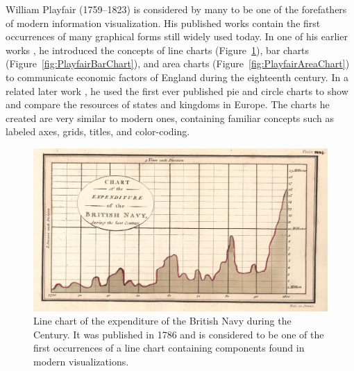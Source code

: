 William Playfair (1759--1823) is considered by many to be one of the
forefathers of modern information visualization. His published works
contain the first occurrences of many graphical forms still widely
used today. In one of his earlier works
\parencite{CommercialAndPoliticalAtlas}, he introduced the concepts of
line charts (Figure~\ref{fig:PlayfairLineChart}), bar charts
(Figure~\ref{fig:PlayfairBarChart}), and area charts
(Figure~\ref{fig:PlayfairAreaChart}) to communicate economic factors
of England during the eighteenth century. In a related later work
\parencite{StatisticalBreviary}, he used the first ever published pie
and circle charts to show and compare the resources of states and
kingdoms in Europe. The charts he created are very similar to modern
ones, containing familiar concepts such as labeled axes, grids,
titles, and color-coding.



\begin{figure}[tp]
\centering
\includegraphics[keepaspectratio,width=\linewidth,height=\thirdh]
{images/playfair-line-chart.jpg}
\caption[Line Chart by William Playfair from 1786]{%
Line chart of the expenditure of the British Navy during the 
Century. It was published in 1786 and is considered to be one of the
first occurrences of a line chart containing components found in
modern visualizations. }
\label{fig:PlayfairLineChart}
\end{figure}



